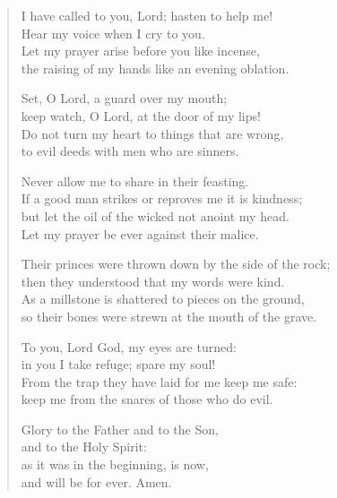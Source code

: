 \settowidth{\versewidth}{Their princes were thrown down by the side of the rock;}
\begin{verse}%
I have called to you, Lord; hasten to help me!\\
    Hear my voice when I cry to you.\\
Let my prayer arise before you like incense,\\
    the raising of my hands like an evening oblation.

Set, O Lord, a guard over my mouth;\\
    keep watch, O Lord, at the door of my lips!\\
Do not turn my heart to things that are wrong,\\
    to evil deeds with men who are sinners.

Never allow me to share in their feasting.\\
    If a good man strikes or reproves me it is kindness;\\
but let the oil of the wicked not anoint my head.\\
    Let my prayer be ever against their malice.

Their princes were thrown down by the side of the rock;\\
    then they understood that my words were kind.\\
As a millstone is shattered to pieces on the ground,\\
    so their bones were strewn at the mouth of the grave.

To you, Lord God, my eyes are turned:\\
    in you I take refuge; spare my soul!\\
From the trap they have laid for me keep me safe:\\
    keep me from the snares of those who do evil.

Glory to the Father and to the Son,\\
    and to the Holy Spirit:\\
as it was in the beginning, is now,\\
    and will be for ever. Amen.
\end{verse}
